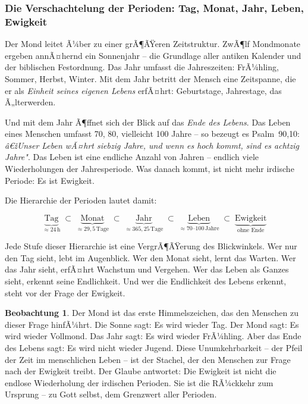 ﻿\documentclass[a4paper,12pt]{article}
\theoremstyle{definition}
\newtheorem{observation}{Beobachtung}[section]
\begin{document}
\subsubsection{Die Verschachtelung der Perioden: Tag, Monat, Jahr, Leben, Ewigkeit}

Der Mond leitet Ã¼ber zu einer grÃ¶ÃŸeren Zeitstruktur. ZwÃ¶lf Mondmonate ergeben
annÃ¤hernd ein Sonnenjahr -- die Grundlage aller antiken Kalender und der
biblischen Festordnung. Das Jahr umfasst die Jahreszeiten: FrÃ¼hling, Sommer,
Herbst, Winter. Mit dem Jahr betritt der Mensch eine Zeitspanne, die er als
\textit{Einheit seines eigenen Lebens} erfÃ¤hrt: Geburtstage, Jahrestage, das
Ã„lterwerden.

Und mit dem Jahr Ã¶ffnet sich der Blick auf das \textit{Ende des Lebens}. Das
Leben eines Menschen umfasst 70, 80, vielleicht 100 Jahre -- so bezeugt es
Psalm~90,10: \textit{â€žUnser Leben wÃ¤hrt siebzig Jahre, und wenn es hoch kommt,
	sind es achtzig Jahre"}. Das Leben ist eine endliche Anzahl von Jahren -- endlich
viele Wiederholungen der Jahresperiode. Was danach kommt, ist nicht mehr irdische
Periode: Es ist Ewigkeit.

Die Hierarchie der Perioden lautet damit:

\begin{equation}
	\underbrace{\text{Tag}}_{\approx 24\,\text{h}}
	\;\subset\;
	\underbrace{\text{Monat}}_{\approx 29{,}5\,\text{Tage}}
	\;\subset\;
	\underbrace{\text{Jahr}}_{\approx 365{,}25\,\text{Tage}}
	\;\subset\;
	\underbrace{\text{Leben}}_{\approx 70\text{--}100\,\text{Jahre}}
	\;\subset\;
	\underbrace{\text{Ewigkeit}}_{\text{ohne Ende}}
\end{equation}

Jede Stufe dieser Hierarchie ist eine VergrÃ¶ÃŸerung des Blickwinkels. Wer nur den
Tag sieht, lebt im Augenblick. Wer den Monat sieht, lernt das Warten. Wer das
Jahr sieht, erfÃ¤hrt Wachstum und Vergehen. Wer das Leben als Ganzes sieht,
erkennt seine Endlichkeit. Und wer die Endlichkeit des Lebens erkennt, steht vor
der Frage der Ewigkeit.

\begin{observation}
	Der Mond ist das erste Himmelszeichen, das den Menschen zu dieser Frage
	hinfÃ¼hrt. Die Sonne sagt: Es wird wieder Tag. Der Mond sagt: Es wird wieder
	Vollmond. Das Jahr sagt: Es wird wieder FrÃ¼hling. Aber das Ende des Lebens
	sagt: Es wird nicht wieder Jugend. Diese Unumkehrbarkeit -- der Pfeil der Zeit
	im menschlichen Leben -- ist der Stachel, der den Menschen zur Frage nach der
	Ewigkeit treibt. Der Glaube antwortet: Die Ewigkeit ist nicht die endlose
	Wiederholung der irdischen Perioden. Sie ist die RÃ¼ckkehr zum Ursprung -- zu
	Gott selbst, dem Grenzwert aller Perioden.
\end{observation}
\end{document}
